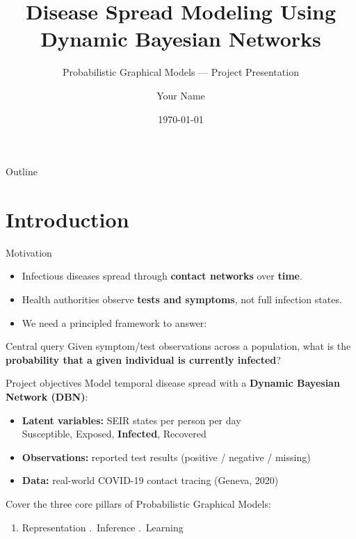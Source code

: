 \documentclass[aspectratio=169,11pt]{beamer}
\title{Disease Spread Modeling Using\\Dynamic Bayesian Networks}
\subtitle{Probabilistic Graphical Models --- Project Presentation}
\author{Your Name}
\institute{Course Project}
\date{\today}
\begin{document}
\begin{frame}
  \titlepage
\end{frame}

\begin{frame}{Outline}
  \tableofcontents
\end{frame}

\section{Introduction}

\begin{frame}{Motivation}
  \begin{itemize}
    \item Infectious diseases spread through \textbf{contact networks} over \textbf{time}.
    \item Health authorities observe \textbf{tests and symptoms}, not full infection states.
    \item We need a principled framework to answer:
  \end{itemize}
  \vspace{0.6em}
  \begin{block}{Central query}
    Given symptom/test observations across a population, what is the
    \textbf{probability that a given individual is currently infected}?
  \end{block}
\end{frame}

\begin{frame}{Project objectives}
  Model temporal disease spread with a \textbf{Dynamic Bayesian Network (DBN)}:
  \begin{itemize}
    \item \textbf{Latent variables:} SEIR states per person per day\\
          Susceptible, Exposed, \textbf{Infected}, Recovered
    \item \textbf{Observations:} reported test results (positive / negative / missing)
    \item \textbf{Data:} real-world COVID-19 contact tracing (Geneva, 2020)
  \end{itemize}
  \vspace{0.5em}
  Cover the three core pillars of Probabilistic Graphical Models:
  \begin{enumerate}
    \item Representation .\ Inference .\ Learning
  \end{enumerate}
\end{frame}
\end{document}
